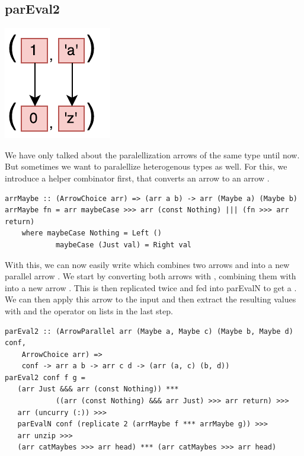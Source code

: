 \subsection{parEval2}
\begin{center}
	\includegraphics[scale=0.7]{images/parEval2}
\end{center}
We have only talked about the paralellization arrows of the same type until now. But sometimes we want to paralellize heterogenous types as well. For this, we introduce a helper combinator  first, that converts an arrow  to an arrow .
\begin{lstlisting}[frame=htrbl]
arrMaybe :: (ArrowChoice arr) => (arr a b) -> arr (Maybe a) (Maybe b)
arrMaybe fn = arr maybeCase >>> arr (const Nothing) ||| (fn >>> arr return)
	where maybeCase Nothing = Left ()
			maybeCase (Just val) = Right val
\end{lstlisting}
With this, we can now easily write  which combines two arrows  and  into a new parallel arrow . We start by converting both arrows with , combining them with \code{***} into a new arrow . This is then replicated twice and fed into parEvalN to get a . We can then apply this arrow to the input  and then extract the resulting values with  and the \code{!!} operator on lists in the last step.
\begin{lstlisting}[frame=htrbl]
parEval2 :: (ArrowParallel arr (Maybe a, Maybe c) (Maybe b, Maybe d) conf,
	ArrowChoice arr) =>
	conf -> arr a b -> arr c d -> (arr (a, c) (b, d))
parEval2 conf f g =
   (arr Just &&& arr (const Nothing)) *** 
			((arr (const Nothing) &&& arr Just) >>> arr return) >>>
   arr (uncurry (:)) >>>
   parEvalN conf (replicate 2 (arrMaybe f *** arrMaybe g)) >>>
   arr unzip >>>
   (arr catMaybes >>> arr head) *** (arr catMaybes >>> arr head)
\end{lstlisting}